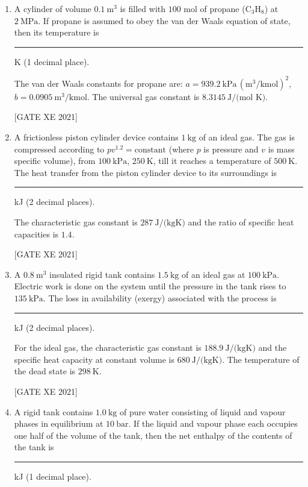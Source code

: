 \documentclass[journal,12pt,onecolumn]{IEEEtran}
\theoremstyle{remark}
\begin{document}
\begin{enumerate}[resume]
Specific heat capacity of air at constant pressure $C_p=1.005\ \text{kJ/(kgK)}$ and characteristic gas constant for air $=0.287\ \text{kJ/(kgK)}$.

\hfill[GATE XE 2021]


\item A cylinder of volume $0.1\ \text{m}^3$ is filled with $100$ mol of propane (C$_3$H$_8$) at $2\ \text{MPa}$. If propane is assumed to obey the van der Waals equation of state, then its temperature is \rule{3cm}{0.15mm} K (1 decimal place).  

The van der Waals constants for propane are: $a = 939.2\ \text{kPa}\,(\text{m}^3/\text{kmol})^2$, $b = 0.0905\ \text{m}^3/\text{kmol}$.  
The universal gas constant is $8.3145\ \text{J/(mol K)}$.

\hfill[GATE XE 2021]


\item A frictionless piston cylinder device contains $1\ \text{kg}$ of an ideal gas. The gas is compressed according to $pv^{1.2} = \text{constant}$ (where $p$ is pressure and $v$ is mass specific volume), from $100\ \text{kPa}$, $250\ \text{K}$, till it reaches a temperature of $500\ \text{K}$. The heat transfer from the piston cylinder device to its surroundings is \rule{3cm}{0.15mm} kJ (2 decimal places).  

The characteristic gas constant is $287\ \text{J/(kgK)}$ and the ratio of specific heat capacities is $1.4$.

\hfill[GATE XE 2021]


\item A $0.8\ \text{m}^3$ insulated rigid tank contains $1.5\ \text{kg}$ of an ideal gas at $100\ \text{kPa}$. Electric work is done on the system until the pressure in the tank rises to $135\ \text{kPa}$. The loss in availability (exergy) associated with the process is \rule{3cm}{0.15mm} kJ (2 decimal places).  

For the ideal gas, the characteristic gas constant is $188.9\ \text{J/(kgK)}$ and the specific heat capacity at constant volume is $680\ \text{J/(kgK)}$. The temperature of the dead state is $298\ \text{K}$.

\hfill[GATE XE 2021]


\item A rigid tank contains $1.0\ \text{kg}$ of pure water consisting of liquid and vapour phases in equilibrium at $10\ \text{bar}$. If the liquid and vapour phase each occupies one half of the volume of the tank, then the net enthalpy of the contents of the tank is \rule{3cm}{0.15mm} kJ (1 decimal place).  


\end{enumerate}
\end{document}
